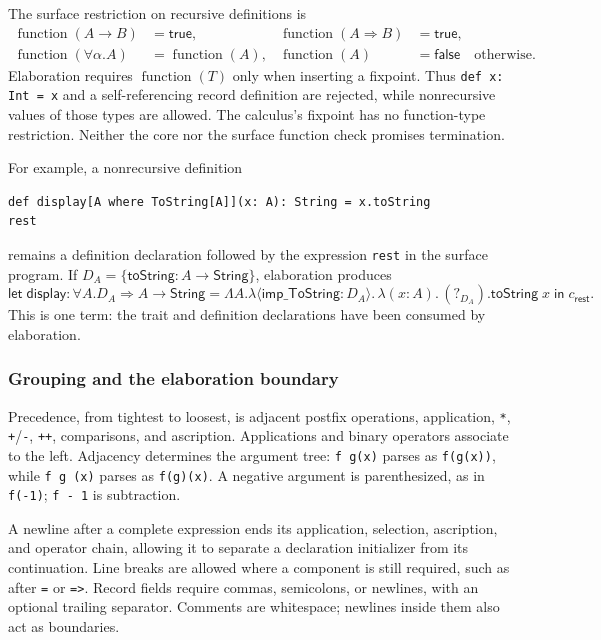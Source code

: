 \documentclass[10pt,a4paper]{article}
\newcommand{\Str}{\mathsf{String}}
\newcommand{\hole}[1]{?_{#1}}
\newcommand{\ilam}[3]{\lambda\langle#1:#2\rangle.\,#3}
\newcommand{\lam}[3]{\lambda(#1:#2).\,#3}
\newcommand{\letin}[3]{\mathsf{let}\;#1=#2\;\mathsf{in}\;#3}
\newcommand{\kw}[1]{\mathsf{#1}}
\begin{document}
The surface restriction on recursive definitions is
\[
\begin{aligned}
 \operatorname{function}(A\to B)&=\mathsf{true},&
 \operatorname{function}(A\Rightarrow B)&=\mathsf{true},\\
 \operatorname{function}(\forall\alpha.A)&=\operatorname{function}(A),&
 \operatorname{function}(A)&=\mathsf{false}\quad\text{otherwise}.
\end{aligned}
\]
Elaboration requires $\operatorname{function}(T)$ only when inserting a fixpoint.
Thus \texttt{def x: Int = x} and a self-referencing record definition are rejected,
while nonrecursive values of those types are allowed. The calculus's fixpoint has
no function-type restriction. Neither the core nor the surface function check
promises termination.

For example, a nonrecursive definition
\begin{lstlisting}
def display[A where ToString[A]](x: A): String = x.toString
rest
\end{lstlisting}
remains a definition declaration followed by the expression \texttt{rest} in the
surface program. If $D_A=\{\kw{toString}:A\to\Str\}$, elaboration produces
\[
 \letin{\kw{display}:\forall A.D_A\Rightarrow A\to\Str}
 {\Lambda A.\ilam{\kw{imp\_ToString}}{D_A}{\lam{x}{A}{(\hole{D_A}).\kw{toString}\;x}}}
 {c_{\kw{rest}}}.
\]
This is one term: the trait and definition declarations have been consumed by elaboration.

\subsubsection*{Grouping and the elaboration boundary}
Precedence, from tightest to loosest, is adjacent postfix operations, application,
\texttt{*}, \texttt{+}/\texttt{-}, \texttt{++}, comparisons, and ascription.
Applications and binary operators associate to the left. Adjacency determines the argument
tree: \texttt{f g(x)} parses as \texttt{f(g(x))}, while \texttt{f g (x)} parses as
\texttt{f(g)(x)}. A negative argument is parenthesized, as in \texttt{f(-1)};
\texttt{f - 1} is subtraction.

A newline after a complete expression ends its application, selection, ascription, and
operator chain, allowing it to separate a declaration initializer from its continuation.
Line breaks are allowed where a component is still required, such as after \texttt{=}
or \texttt{=>}. Record fields require commas, semicolons, or newlines, with an optional
trailing separator. Comments are whitespace; newlines inside them also act as boundaries.
\end{document}
